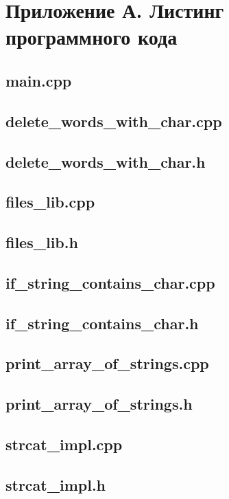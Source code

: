 \newpage
\section*{Приложение А. Листинг программного кода}

\subsection*{main.cpp}


\newpage
\subsection*{delete\_words\_with\_char.cpp}


\newpage
\subsection*{delete\_words\_with\_char.h}


\newpage
\subsection*{files\_lib.cpp}


\newpage
\subsection*{files\_lib.h}


\newpage
\subsection*{if\_string\_contains\_char.cpp}


\newpage
\subsection*{if\_string\_contains\_char.h}


\newpage
\subsection*{print\_array\_of\_strings.cpp}


\newpage
\subsection*{print\_array\_of\_strings.h}


\newpage
\subsection*{strcat\_impl.cpp}


\newpage
\subsection*{strcat\_impl.h}

